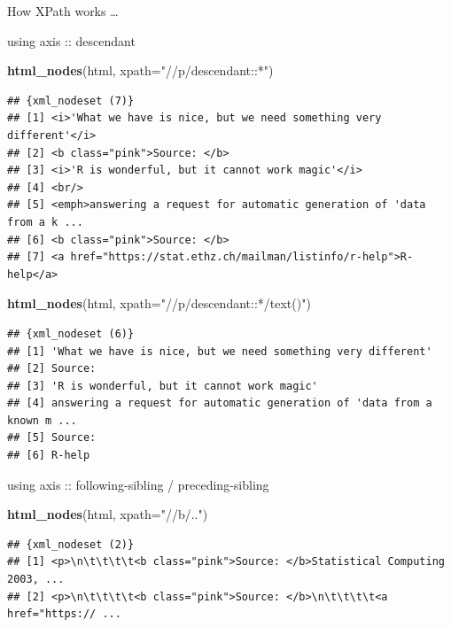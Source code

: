 \documentclass[ignorenonframetext,]{beamer}
\newenvironment{Shaded}{\begin{snugshade}}{\end{snugshade}}
\newcommand{\KeywordTok}[1]{\textcolor[rgb]{0.13,0.29,0.53}{\textbf{{#1}}}}
\newcommand{\DataTypeTok}[1]{\textcolor[rgb]{0.13,0.29,0.53}{{#1}}}
\newcommand{\StringTok}[1]{\textcolor[rgb]{0.31,0.60,0.02}{{#1}}}
\newcommand{\NormalTok}[1]{{#1}}
\begin{document}
\begin{frame}[fragile]{How XPath works \ldots{}}
\begin{block}{using axis :: descendant}
\begin{Shaded}
\begin{Highlighting}[]
\KeywordTok{html_nodes}\NormalTok{(html, }\DataTypeTok{xpath=}\StringTok{"//p/descendant::*"}\NormalTok{)}
\end{Highlighting}
\end{Shaded}

\begin{verbatim}
## {xml_nodeset (7)}
## [1] <i>'What we have is nice, but we need something very different'</i>
## [2] <b class="pink">Source: </b>
## [3] <i>'R is wonderful, but it cannot work magic'</i>
## [4] <br/>
## [5] <emph>answering a request for automatic generation of 'data from a k ...
## [6] <b class="pink">Source: </b>
## [7] <a href="https://stat.ethz.ch/mailman/listinfo/r-help">R-help</a>
\end{verbatim}

\begin{Shaded}
\begin{Highlighting}[]
\KeywordTok{html_nodes}\NormalTok{(html, }\DataTypeTok{xpath=}\StringTok{"//p/descendant::*/text()"}\NormalTok{)}
\end{Highlighting}
\end{Shaded}

\begin{verbatim}
## {xml_nodeset (6)}
## [1] 'What we have is nice, but we need something very different'
## [2] Source: 
## [3] 'R is wonderful, but it cannot work magic'
## [4] answering a request for automatic generation of 'data from a known m ...
## [5] Source: 
## [6] R-help
\end{verbatim}

\end{block}

\begin{block}{using axis :: following-sibling / preceding-sibling}

\begin{Shaded}
\begin{Highlighting}[]
\KeywordTok{html_nodes}\NormalTok{(html, }\DataTypeTok{xpath=}\StringTok{"//b/.."}\NormalTok{)}
\end{Highlighting}
\end{Shaded}

\begin{verbatim}
## {xml_nodeset (2)}
## [1] <p>\n\t\t\t\t<b class="pink">Source: </b>Statistical Computing 2003, ...
## [2] <p>\n\t\t\t\t<b class="pink">Source: </b>\n\t\t\t\t<a href="https:// ...
\end{verbatim}


\end{block}
\end{frame}
\end{document}
